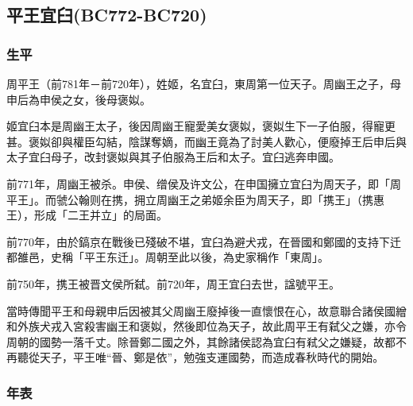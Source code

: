 
\subsection{平王宜臼{\tiny(BC772-BC720)}}

\subsubsection{生平}

周平王（前781年－前720年），姓姬，名宜臼，東周第一位天子。周幽王之子，母申后為申侯之女，後母褒姒。

姬宜臼本是周幽王太子，後因周幽王寵愛美女褒姒，褒姒生下一子伯服，得寵更甚。褒姒卻與權臣勾結，陰謀奪嫡，而幽王竟為了討美人歡心，便廢掉王后申后與太子宜臼母子，改封褒姒與其子伯服為王后和太子。宜臼逃奔申國。

前771年，周幽王被杀。申侯、缯侯及许文公，在申国擁立宜臼为周天子，即「周平王」。而虢公翰则在携，拥立周幽王之弟姬余臣为周天子，即「携王」（携惠王），形成「二王并立」的局面。

前770年，由於鎬京在戰後已殘破不堪，宜臼為避犬戎，在晉國和鄭國的支持下迁都雒邑，史稱「平王东迁」。周朝至此以後，為史家稱作「東周」。

前750年，携王被晋文侯所弑。前720年，周王宜臼去世，諡號平王。

當時傳聞平王和母親申后因被其父周幽王廢掉後一直懷恨在心，故意聯合諸侯國繒和外族犬戎入宮殺害幽王和褒姒，然後即位為天子，故此周平王有弑父之嫌，亦令周朝的國勢一落千丈。除晉鄭二國之外，其餘諸侯認為宜臼有弒父之嫌疑，故都不再聽從天子，平王唯“晉、鄭是依”，勉強支運國勢，而造成春秋時代的開始。

\subsubsection{年表}

